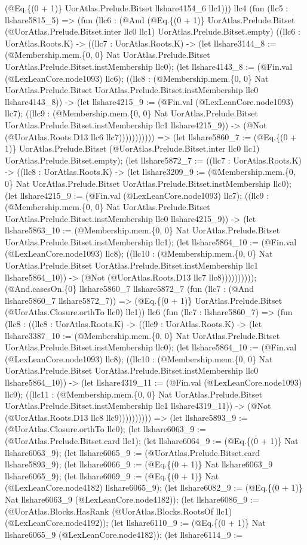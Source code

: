 \documentclass[11pt]{article}
\begin{document}
(@Eq.\{(0 + 1)\} UorAtlas.Prelude.Bitset llshare4154\_6 llc1))) llc4 (fun (llc5 : llshare5815\_5) => (fun (llc6 : (@And (@Eq.\{(0 + 1)\} UorAtlas.Prelude.Bitset (@UorAtlas.Prelude.Bitset.inter llc0 llc1) UorAtlas.Prelude.Bitset.empty) ((llc6 : UorAtlas.Roots.K) -> ((llc7 : UorAtlas.Roots.K) -> (let llshare3144\_8 := (@Membership.mem.\{0, 0\} Nat UorAtlas.Prelude.Bitset UorAtlas.Prelude.Bitset.instMembership llc0); (let llshare4143\_8 := (@Fin.val (@LexLeanCore.node1093) llc6); ((llc8 : (@Membership.mem.\{0, 0\} Nat UorAtlas.Prelude.Bitset UorAtlas.Prelude.Bitset.instMembership llc0 llshare4143\_8)) -> (let llshare4215\_9 := (@Fin.val (@LexLeanCore.node1093) llc7); ((llc9 : (@Membership.mem.\{0, 0\} Nat UorAtlas.Prelude.Bitset UorAtlas.Prelude.Bitset.instMembership llc1 llshare4215\_9)) -> (@Not (@UorAtlas.Roots.D13 llc6 llc7))))))))))) => (let llshare5860\_7 := (@Eq.\{(0 + 1)\} UorAtlas.Prelude.Bitset (@UorAtlas.Prelude.Bitset.inter llc0 llc1) UorAtlas.Prelude.Bitset.empty); (let llshare5872\_7 := ((llc7 : UorAtlas.Roots.K) -> ((llc8 : UorAtlas.Roots.K) -> (let llshare3209\_9 := (@Membership.mem.\{0, 0\} Nat UorAtlas.Prelude.Bitset UorAtlas.Prelude.Bitset.instMembership llc0); (let llshare4215\_9 := (@Fin.val (@LexLeanCore.node1093) llc7); ((llc9 : (@Membership.mem.\{0, 0\} Nat UorAtlas.Prelude.Bitset UorAtlas.Prelude.Bitset.instMembership llc0 llshare4215\_9)) -> (let llshare5863\_10 := (@Membership.mem.\{0, 0\} Nat UorAtlas.Prelude.Bitset UorAtlas.Prelude.Bitset.instMembership llc1); (let llshare5864\_10 := (@Fin.val (@LexLeanCore.node1093) llc8); ((llc10 : (@Membership.mem.\{0, 0\} Nat UorAtlas.Prelude.Bitset UorAtlas.Prelude.Bitset.instMembership llc1 llshare5864\_10)) -> (@Not (@UorAtlas.Roots.D13 llc7 llc8)))))))))); (@And.casesOn.\{0\} llshare5860\_7 llshare5872\_7 (fun (llc7 : (@And llshare5860\_7 llshare5872\_7)) => (@Eq.\{(0 + 1)\} UorAtlas.Prelude.Bitset (@UorAtlas.Closure.orthTo llc0) llc1)) llc6 (fun (llc7 : llshare5860\_7) => (fun (llc8 : ((llc8 : UorAtlas.Roots.K) -> ((llc9 : UorAtlas.Roots.K) -> (let llshare3387\_10 := (@Membership.mem.\{0, 0\} Nat UorAtlas.Prelude.Bitset UorAtlas.Prelude.Bitset.instMembership llc0); (let llshare5864\_10 := (@Fin.val (@LexLeanCore.node1093) llc8); ((llc10 : (@Membership.mem.\{0, 0\} Nat UorAtlas.Prelude.Bitset UorAtlas.Prelude.Bitset.instMembership llc0 llshare5864\_10)) -> (let llshare4319\_11 := (@Fin.val (@LexLeanCore.node1093) llc9); ((llc11 : (@Membership.mem.\{0, 0\} Nat UorAtlas.Prelude.Bitset UorAtlas.Prelude.Bitset.instMembership llc1 llshare4319\_11)) -> (@Not (@UorAtlas.Roots.D13 llc8 llc9)))))))))) => (let llshare5893\_9 := (@UorAtlas.Closure.orthTo llc0); (let llshare6063\_9 := (@UorAtlas.Prelude.Bitset.card llc1); (let llshare6064\_9 := (@Eq.\{(0 + 1)\} Nat llshare6063\_9); (let llshare6065\_9 := (@UorAtlas.Prelude.Bitset.card llshare5893\_9); (let llshare6066\_9 := (@Eq.\{(0 + 1)\} Nat llshare6063\_9 llshare6065\_9); (let llshare6069\_9 := (@Eq.\{(0 + 1)\} Nat (@LexLeanCore.node4182) llshare6065\_9); (let llshare6082\_9 := (@Eq.\{(0 + 1)\} Nat llshare6063\_9 (@LexLeanCore.node4182)); (let llshare6086\_9 := (@UorAtlas.Blocks.HasRank (@UorAtlas.Blocks.RootsOf llc1) (@LexLeanCore.node4192)); (let llshare6110\_9 := (@Eq.\{(0 + 1)\} Nat llshare6065\_9 (@LexLeanCore.node4182)); (let llshare6114\_9 := 
\end{document}
